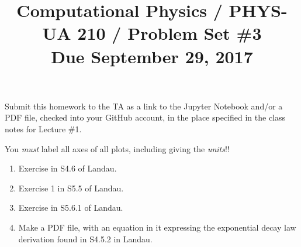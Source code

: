 \documentclass[11pt, preprint]{aastex}
\begin{document}
\title{\bf Computational Physics / PHYS-UA 210 / Problem Set \#3
\\ Due September 29, 2017 }

Submit this homework to the TA as a link to the Jupyter Notebook
and/or a PDF file, checked into your GitHub account, in the place
specified in the class notes for Lecture \#1.

You {\it must} label all axes of all plots, including giving the {\it
  units}!!

\begin{enumerate}

  \item Exercise in S4.6 of Landau.

  \item Exercise 1 in S5.5 of Landau.

  \item Exercise in S5.6.1 of Landau.

  \item Make a PDF file, with an equation in it expressing the
    exponential decay law derivation found in S4.5.2 in Landau.

\end{enumerate}
\end{document}

